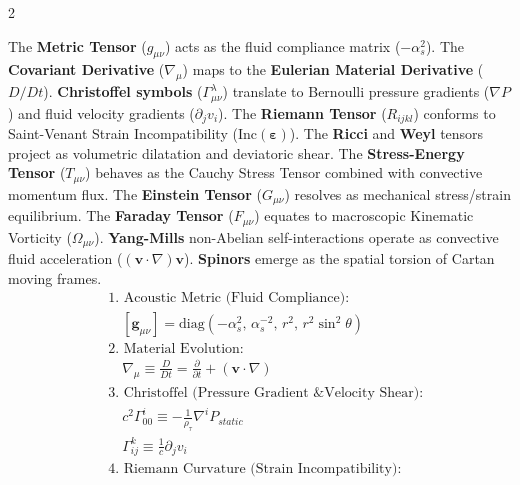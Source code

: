 \begin{multicols}{2}
\begin{tcolorbox}[cheatbox, title={\refstepcounter{cheatnum}\label{box:rosetta_stone}\thecheatnum. Tensor Evolution \& Geometry\scriptsize\hfill\hyperref[sec:deriv_rosetta_stone]{[Proof $\downarrow$]}}]
The \textbf{Metric Tensor} ($g_{\mu\nu}$) acts as the fluid compliance matrix ($-\alpha_s^2$). The \textbf{Covariant Derivative} ($\nabla_\mu$) maps to the \textbf{Eulerian Material Derivative} ($D/Dt$). \textbf{Christoffel symbols} ($\Gamma^\lambda_{\mu\nu}$) translate to Bernoulli pressure gradients ($\nabla P$) and fluid velocity gradients ($\partial_j v_i$). The \textbf{Riemann Tensor} ($R_{ijkl}$) conforms to Saint-Venant Strain Incompatibility ($\text{Inc}(\boldsymbol{\varepsilon})$). The \textbf{Ricci} and \textbf{Weyl} tensors project as volumetric dilatation and deviatoric shear. The \textbf{Stress-Energy Tensor} ($T_{\mu\nu}$) behaves as the Cauchy Stress Tensor combined with convective momentum flux. The \textbf{Einstein Tensor} ($G_{\mu\nu}$) resolves as mechanical stress/strain equilibrium. The \textbf{Faraday Tensor} ($F_{\mu\nu}$) equates to macroscopic Kinematic Vorticity ($\Omega_{\mu\nu}$). \textbf{Yang-Mills} non-Abelian self-interactions operate as convective fluid acceleration ($(\mathbf{v} \cdot \nabla)\mathbf{v}$). \textbf{Spinors} emerge as the spatial torsion of Cartan moving frames. %
\begin{align}
    &\text{1. Acoustic Metric (Fluid Compliance):} \nonumber \\
    &\quad [\boldsymbol{g}_{\mu\nu}] = \text{diag}(-\alpha_s^2, \, \alpha_s^{-2}, \, r^2, \, r^2\sin^2\theta) 
    \label{eq:rosetta_metric_matrix} \\
    &\text{2. Material Evolution:} \nonumber \\
    &\quad \nabla_\mu \equiv \frac{D}{Dt} = \frac{\partial}{\partial t} + (\mathbf{v} \cdot \nabla) \label{eq:rosetta_covariant} \\
    &\text{3. Christoffel (Pressure Gradient \& Velocity Shear):} \nonumber \\
    &\quad c^2 \Gamma^i_{00} \equiv -\frac{1}{\rho_{\tau}} \nabla^i P_{static} \label{eq:rosetta_christoffel_pressure} \\
    &\quad \Gamma^k_{ij} \equiv \frac{1}{c} \partial_j v_i \label{eq:rosetta_christoffel} \\
    &\text{4. Riemann Curvature (Strain Incompatibility):} \nonumber \\

\end{align}
\end{tcolorbox}
\end{multicols}
